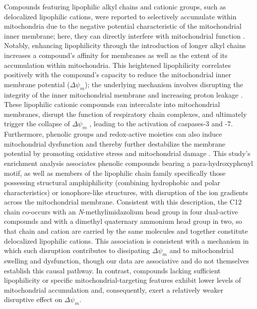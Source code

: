 \documentclass[letterpaper]{article}
\begin{document}
Compounds featuring lipophilic alkyl chains and cationic groups, such as delocalized lipophilic cations, were reported to selectively accumulate within mitochondria due to the negative potential characteristic of the mitochondrial inner membrane; here, they can directly interfere with mitochondrial function \cite{dzajic2025lipophilic}. Notably, enhancing lipophilicity through the introduction of longer alkyl chains increases a compound's affinity for membranes as well as the extent of its accumulation within mitochondria. This heightened lipophilicity correlates positively with the compound's capacity to reduce the mitochondrial inner membrane potential ($\Delta \psi_m$); the underlying mechanism involves disrupting the integrity of the inner mitochondrial membrane and increasing proton leakage \cite{trnka2015lipophilic}. These lipophilic cationic compounds can intercalate into mitochondrial membranes, disrupt the function of respiratory chain complexes, and ultimately trigger the collapse of $\Delta \psi_m$ \cite{trnka2015lipophilic}, leading to the activation of caspases-3 and -7. Furthermore, phenolic groups and redox-active moieties can also induce mitochondrial dysfunction and thereby further destabilize the membrane potential by promoting oxidative stress and mitochondrial damage \cite{fernandes2021cytotoxicity}. This study's enrichment analysis associates phenolic compounds bearing a  para-hydroxyphenyl motif, as well as members of the lipophilic chain family specifically those possessing structural amphiphilicity (combining hydrophobic and polar characteristics) or ionophore-like structures, with disruption of the ion gradients across the mitochondrial membrane. Consistent with this description, the C12 chain co-occurs with an \textit{N}-methylimidazolium head group in four dual-active compounds and with a dimethyl quaternary ammonium head group in two, so that chain and cation are carried by the same molecules and together constitute delocalized lipophilic cations. This association is consistent with a mechanism in which such disruption contributes to dissipating $\Delta \psi_m$ and to mitochondrial swelling and dysfunction, though our data are associative and do not themselves establish this causal pathway. In contrast, compounds lacking sufficient lipophilicity or specific mitochondrial-targeting features exhibit lower levels of mitochondrial accumulation and, consequently, exert a relatively weaker disruptive effect on $\Delta \psi_m$.
\end{document}
